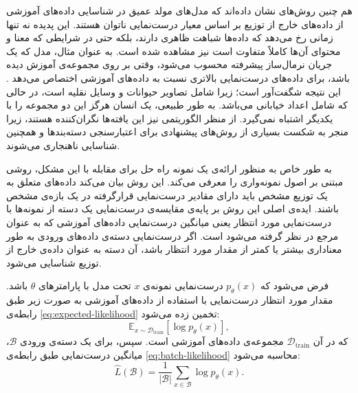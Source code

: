 هم چنین روش‌های \cite{Nalisnick2019, Choi2019, Shafaei2018} نشان داده‌اند که {مدل‌های مولد عمیق} در شناسایی داده‌های آموزشی از داده‌های خارج از توزیع بر اساس معیار درست‌نمایی ناتوان هستند. این پدیده نه تنها زمانی رخ می‌دهد که داده‌ها شباهت ظاهری دارند، بلکه حتی در شرایطی که معنا و محتوای آن‌ها کاملاً متفاوت است نیز مشاهده شده است. به عنوان مثال، مدل  \cite{Kingma2018} که یک جریان نرمال‌ساز پیشرفته محسوب می‌شود، وقتی بر روی مجموعه‌ی  آموزش دیده باشد، برای داده‌های  درست‌نمایی بالاتری نسبت به داده‌های آموزشی  اختصاص می‌دهد \cite{Nalisnick2019, Choi2019}. این نتیجه شگفت‌آور است؛ زیرا  شامل تصاویر حیوانات و وسایل نقلیه است، در حالی که  شامل اعداد خیابانی می‌باشد. به طور طبیعی، یک انسان هرگز این دو مجموعه را با یکدیگر اشتباه نمی‌گیرد. 
از منظر الگوریتمی نیز این یافته‌ها نگران‌کننده هستند، زیرا منجر به شکست بسیاری از روش‌های پیشنهادی برای اعتبارسنجی دسته‌بندها \cite{Bishop1994} و همچنین شناسایی ناهنجاری \cite{Pimentel2014} می‌شوند.

به طور خاص به منظور ارائه‌ی یک نمونه راه حل برای مقابله با این مشکل، \cite{typicality} روشی مبتنی بر {اصول نمونه‌واری} را معرفی می‌کند. این روش بیان می‌کند داده‌های متعلق به یک توزیع مشخص باید دارای مقادیر درست‌نمایی قرارگرفته در یک بازه‌ی مشخص باشند. ایده‌ی اصلی این روش بر پایه‌ی مقایسه‌ی درست‌نمایی یک دسته از نمونه‌ها با { درست‌نمایی مورد انتظار} یعنی میانگین درست‌نمایی داده‌های آموزشی که به عنوان مرجع در نظر گرفته می‌شود است. اگر درست‌نمایی دسته‌ی داده‌های ورودی به طور معناداری بیشتر یا کمتر از مقدار مورد انتظار باشد، آن دسته به عنوان داده‌ی خارج از توزیع شناسایی می‌شود.

فرض می‌شود که $p_\theta(x)$ درست‌نمایی نمونه‌ی $x$ تحت مدل با پارامترهای $\theta$ باشد. مقدار مورد انتظار درست‌نمایی با استفاده از داده‌های آموزشی به صورت زیر طبق رابطه‌ی \ref{eq:expected-likelihood} تخمین زده می‌شود\cite{typicality}:
\begin{equation}
	\label{eq:expected-likelihood}
	\mathbb{E}_{x \sim \mathcal{D}_{\text{train}}}\left[ \log p_\theta(x) \right],
\end{equation}
که در آن $\mathcal{D}_{\text{train}}$ مجموعه‌ی داده‌های آموزشی است. سپس، برای یک دسته‌ی ورودی $\mathcal{B}$، میانگین درست‌نمایی طبق رابطه‌ی \ref{eq:batch-likelihood} محاسبه می‌شود\cite{typicality}:
\begin{equation}
	\label{eq:batch-likelihood}
	\hat{L}(\mathcal{B}) = \frac{1}{|\mathcal{B}|} \sum_{x \in \mathcal{B}} \log p_\theta(x).
\end{equation}


